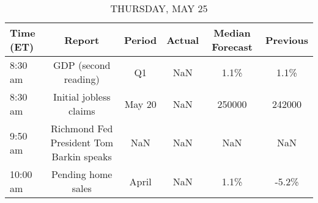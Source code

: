 \documentclass{article}%
\begin{document}
%


\begin{table}[htbp]%
\caption{THURSDAY, MAY 25}%
\centering%
\begin{adjustbox}{width=1\textwidth}%
\begin{tabular}{lccccc}
\toprule
Time (ET) &                                   Report & Period & Actual & Median Forecast & Previous \\
\midrule
  8:30 am &                     GDP (second reading) &     Q1 &    NaN &            1.1\% &     1.1\% \\
  8:30 am &                   Initial jobless claims & May 20 &    NaN &          250000 &   242000 \\
  9:50 am & Richmond Fed President Tom Barkin speaks &    NaN &    NaN &             NaN &      NaN \\
 10:00 am &                       Pending home sales &  April &    NaN &            1.1\% &    -5.2\% \\
\bottomrule
\end{tabular}
%
\end{adjustbox}%
\end{table}

%
\end{document}
